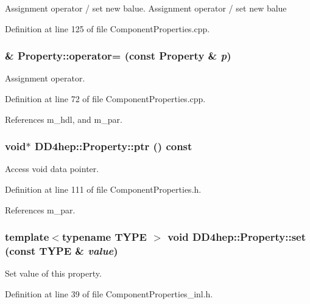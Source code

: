 Assignment operator / set new balue. Assignment operator / set new balue 

Definition at line 125 of file ComponentProperties.cpp.\hypertarget{class_d_d4hep_1_1_property_a18c732c983b1ae9f1c1cc801e6e17706}{
\subsubsection[{operator=}]{ \& Property::operator= (const {\bf Property} \& {\em p})}}
\label{class_d_d4hep_1_1_property_a18c732c983b1ae9f1c1cc801e6e17706}


Assignment operator. 

Definition at line 72 of file ComponentProperties.cpp.

References m\_\-hdl, and m\_\-par.\hypertarget{class_d_d4hep_1_1_property_a45508a845f738435f49d680837e77619}{
\subsubsection[{ptr}]{\setlength{\rightskip}{0pt plus 5cm}void$\ast$ DD4hep::Property::ptr () const}}
\label{class_d_d4hep_1_1_property_a45508a845f738435f49d680837e77619}


Access void data pointer. 

Definition at line 111 of file ComponentProperties.h.

References m\_\-par.\hypertarget{class_d_d4hep_1_1_property_a3f4ec149415ffae17a248fb03afd230f}{
\subsubsection[{set}]{\setlength{\rightskip}{0pt plus 5cm}template$<$typename TYPE $>$ void DD4hep::Property::set (const TYPE \& {\em value})}}
\label{class_d_d4hep_1_1_property_a3f4ec149415ffae17a248fb03afd230f}


Set value of this property. 

Definition at line 39 of file ComponentProperties\_\-inl.h.

